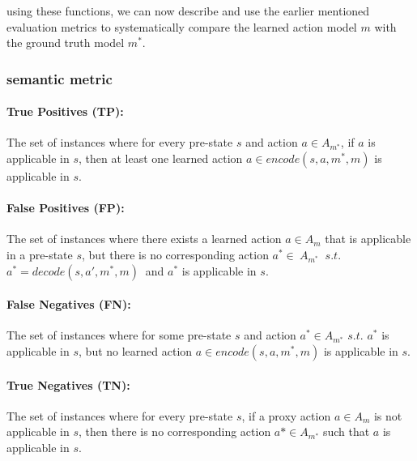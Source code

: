 using these functions, we can now describe and use the earlier mentioned evaluation metrics to systematically compare the learned action model \( m \) with the ground truth model \( m^* \).

\subsubsection{semantic metric}
\paragraph{True Positives (TP):}
The set of instances where for every pre-state $s$ and action $a \in A_{m^*}$, if $a$ is applicable in $s$, then at least one learned action $a \in encode(s, a, m^*, m)$ is applicable in $s$.
\paragraph{False Positives (FP):}
The set of instances where there exists a learned action $a \in A_m$ that is applicable in a pre-state $s$, but there is no corresponding action $ a^* \in\ A_{m^*}\ $ $s.t.$ $a^*=decode(s,a',m^*,m) \ $ and $a^*$ is applicable in $s$.
\paragraph{False Negatives (FN):}
The set of instances where for some pre-state $s$ and action $a^* \in A_{m^*}$ $s.t.$ $a^*$ is applicable in $s$, but no learned action $a \in encode(s, a, m^*, m)$ is applicable in $s$.
\paragraph{True Negatives (TN):}
The set of instances where for every pre-state $s$, if a proxy action $a \in A_m$ is not applicable in $s$, then there is no corresponding action $a* \in A_{m^*}$ such that $a$ is applicable in $s$.

